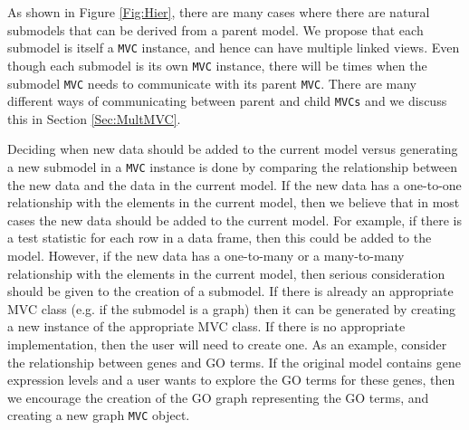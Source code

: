 \documentclass[11pt]{article}
\newcommand{\Robject}[1]{{\texttt{#1}}}
\begin{document}
As shown in Figure \ref{Fig:Hier}, there are many cases where there are
natural submodels that can be derived from a parent model.  We propose that
each submodel is itself a \Robject{MVC} instance, and hence can have multiple
linked views.  Even though each submodel is its own \Robject{MVC} instance,
there will be times when the submodel \Robject{MVC} needs to communicate with
its parent \Robject{MVC}.  There are many different ways of communicating
between parent and child \Robject{MVCs} and we discuss this in Section
\ref{Sec:MultMVC}.

Deciding when new data should be added to the current model versus generating
a new submodel in a \Robject{MVC} instance is done by comparing the
relationship between the new data and the data in the current model.  If the
new data has a one-to-one relationship with the elements in the current model,
then we believe that in most cases the new data should be added to the 
current model.  For example, if there is
a test statistic for each row in a data frame, then this could be added to the
model.  However, if the new data has a one-to-many or a many-to-many
relationship with the elements in the current model, then serious
consideration should be given to the creation of a submodel.  If there is
already an appropriate MVC class (e.g. if the submodel is a graph) then it can
be generated by creating a new instance of the appropriate MVC class.  If there
is no appropriate implementation, then the user will need to create one.  
As an example, consider the
relationship between genes and GO terms.  If the original model contains gene
expression levels and a user wants to explore the GO terms for these genes,
then we encourage the creation of the GO graph representing the GO terms, and
creating a new graph \Robject{MVC} object.

\end{document}
